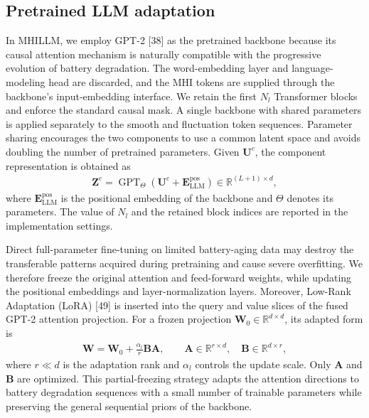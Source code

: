 \documentclass[preprint,12pt]{elsarticle}
\begin{document}
\subsection{Pretrained LLM adaptation}

In MHILLM, we employ GPT-2 [38] as the pretrained backbone because its causal attention mechanism is naturally compatible with the progressive evolution of battery degradation. The word-embedding layer and language-modeling head are discarded, and the MHI tokens are supplied through the backbone's input-embedding interface. We retain the first $N_l$ Transformer blocks and enforce the standard causal mask. A single backbone with shared parameters is applied separately to the smooth and fluctuation token sequences. Parameter sharing encourages the two components to use a common latent space and avoids doubling the number of pretrained parameters. Given $\mathbf{U}^{c}$, the component representation is obtained as
\begin{gather}
\mathbf{Z}^{c}=\operatorname{GPT}_{\Theta}\left(\mathbf{U}^{c}+\mathbf{E}_{\mathrm{LLM}}^{\mathrm{pos}}\right)\in\mathbb{R}^{(L+1)\times d},
\end{gather}
where $\mathbf{E}_{\mathrm{LLM}}^{\mathrm{pos}}$ is the positional embedding of the backbone and $\Theta$ denotes its parameters. The value of $N_l$ and the retained block indices are reported in the implementation settings.

Direct full-parameter fine-tuning on limited battery-aging data may destroy the transferable patterns acquired during pretraining and cause severe overfitting. We therefore freeze the original attention and feed-forward weights, while updating the positional embeddings and layer-normalization layers. Moreover, Low-Rank Adaptation (LoRA) [49] is inserted into the query and value slices of the fused GPT-2 attention projection. For a frozen projection $\mathbf{W}_{0}\in\mathbb{R}^{d\times d}$, its adapted form is
\begin{gather}
\mathbf{W}=\mathbf{W}_{0}+\frac{\alpha_{l}}{r}\mathbf{B}\mathbf{A},\qquad
\mathbf{A}\in\mathbb{R}^{r\times d},\quad \mathbf{B}\in\mathbb{R}^{d\times r},
\end{gather}
where $r\ll d$ is the adaptation rank and $\alpha_l$ controls the update scale. Only $\mathbf{A}$ and $\mathbf{B}$ are optimized. This partial-freezing strategy adapts the attention directions to battery degradation sequences with a small number of trainable parameters while preserving the general sequential priors of the backbone.
\end{document}
